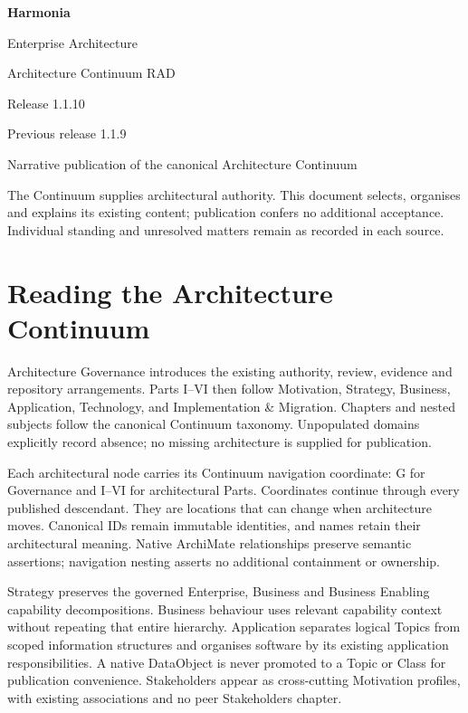 \documentclass[10pt,a4paper,oneside,headings=small]{scrreprt}
\begin{document}
\hypersetup{pageanchor=false}
\begin{titlepage}
\vspace*{24mm}
{\Huge\bfseries\color{Ink} Harmonia\par}
\vspace{8mm}
{\LARGE Enterprise Architecture\par Architecture Continuum RAD\par}
\vspace{12mm}
{\Large Release 1.1.10\par Previous release 1.1.9\par}
\vfill
Narrative publication of the canonical Architecture Continuum\par
\vspace{8mm}
The Continuum supplies architectural authority. This document selects, organises
and explains its existing content; publication confers no additional acceptance.
Individual standing and unresolved matters remain as recorded in each source.
\end{titlepage}
\hypersetup{pageanchor=true}
\tableofcontents
\chapter*{Reading the Architecture Continuum}
Architecture Governance introduces the existing authority, review, evidence and
repository arrangements. Parts I--VI then follow Motivation, Strategy, Business,
Application, Technology, and Implementation \& Migration. Chapters and nested
subjects follow the canonical Continuum taxonomy. Unpopulated domains explicitly
record absence; no missing architecture is supplied for publication.

Each architectural node carries its Continuum navigation coordinate: G for
Governance and I--VI for architectural Parts. Coordinates continue through every
published descendant. They are locations that can change when architecture moves.
Canonical IDs remain immutable identities, and names retain their architectural
meaning. Native ArchiMate relationships preserve semantic assertions; navigation
nesting asserts no additional containment or ownership.

Strategy preserves the governed Enterprise, Business and Business Enabling
capability decompositions. Business behaviour uses relevant capability context
without repeating that entire hierarchy. Application separates logical Topics
from scoped information structures and organises software by its existing
application responsibilities. A native DataObject is never promoted to a Topic
or Class for publication convenience. Stakeholders appear as cross-cutting
Motivation profiles, with existing associations and no peer Stakeholders chapter.
\end{document}
